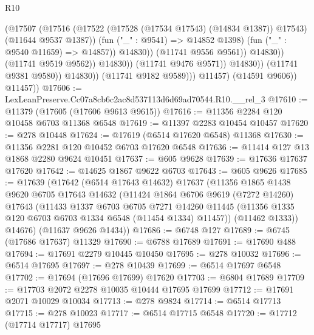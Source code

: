 \begin{lexlean}{R10}
\begin{coremodule}
                                            (@17507
                                              (@17516
                                                (@17522
                                                  (@17528 (@17534 @17543) (@14834 @1387))
                                                  @17543)
                                                (@11644 @9537 @1387))
                                              (fun ("_" : @9541) => @14852 @1398)
                                              (fun ("_" : @9540 @11659) => @14857))
                                            @14830))
                                        (@11741 @9556 @9561))
                                      @14830))
                                  (@11741 @9519 @9562))
                                @14830))
                            (@11741 @9476 @9571))
                          @14830))
                      (@11741 @9381 @9580))
                    @14830))
                (@11741 @9182 @9589)))
            @11457)
          (@14591 @9606))
        @11457))
@17606 := LexLeanPreserve.Cc07a8cb6c2ac8d537113d6d69ad70544.R10.__rel_3
@17610 := @11379 (@17605 (@17606 @9613 @9615))
@17616 := @11356 @2284 @120 @10458 @6703 @11368 @6548
@17619 := @11397 @2283 @10454 @10457
@17620 := @278 @10448
@17624 := @17619 (@6514 @17620 @6548) @11368
@17630 := @11356 @2281 @120 @10452 @6703 @17620 @6548
@17636 := @11414 @127 @13 @1868 @2280 @9624 @10451
@17637 := @605 @9628
@17639 := @17636 @17637 @17620
@17642 := @14625 @1867 @9622 @6703
@17643 := @605 @9626
@17685 := @17639
    (@17642
      (@6514 @17643 @14632)
      @17637
      (@11356
        @1865
        @1438
        @9620
        @6705
        @17643
        @14632
        (@11424
          @1864
          @6706
          @9619
          (@7272 @14260)
          @17643
          (@11433
            @1337
            @6703
            @6705
            @7271
            @14260
            @11445
            (@11356 @1335 @120 @6703 @6703 @1334 @6548 (@11454 @1334) @11457))
          (@11462 @1333))
        @14676)
      (@11637 @9626 @1434))
@17686 := @6748 @127
@17689 := @6745 (@17686 @17637) @11329
@17690 := @6788 @17689
@17691 := @17690 @488
@17694 := @17691 @2279 @10445 @10450
@17695 := @278 @10032
@17696 := @6514 @17695
@17697 := @278 @10439
@17699 := @6514 @17697 @6548
@17702 := @17694 (@17696 @17699) @17620
@17703 := @6804 @17689
@17709 := @17703 @2072 @2278 @10035 @10444 @17695 @17699
@17712 := @17691 @2071 @10029 @10034
@17713 := @278 @9824
@17714 := @6514 @17713
@17715 := @278 @10023
@17717 := @6514 @17715 @6548
@17720 := @17712 (@17714 @17717) @17695

\end{coremodule}
\end{lexlean}
